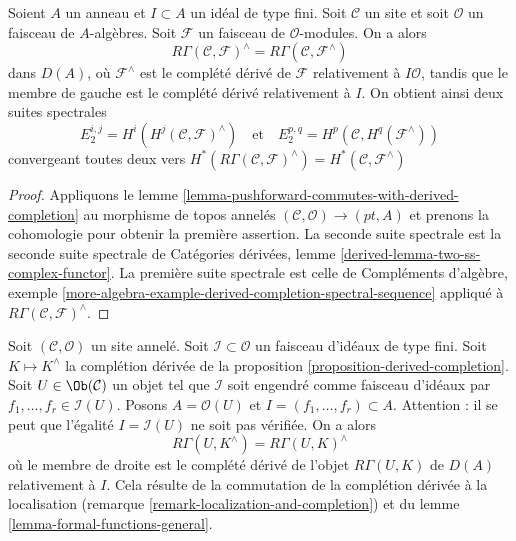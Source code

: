 \begin{lemma}
\label{lemma-formal-functions-general}
Soient $A$ un anneau et $I \subset A$ un idéal de type fini.
Soit $\mathcal{C}$ un site et soit $\mathcal{O}$ un faisceau
de $A$-algèbres. Soit $\mathcal{F}$ un faisceau de $\mathcal{O}$-modules.
On a alors
$$
R\Gamma(\mathcal{C}, \mathcal{F})^\wedge =
R\Gamma(\mathcal{C}, \mathcal{F}^\wedge)
$$
dans $D(A)$, où $\mathcal{F}^\wedge$ est le complété
dérivé de $\mathcal{F}$ relativement à $I\mathcal{O}$, tandis que le membre de
gauche est le complété dérivé relativement à $I$.
On obtient ainsi deux suites spectrales
$$
E_2^{i, j} = H^i(H^j(\mathcal{C}, \mathcal{F})^\wedge)
\quad\text{et}\quad
E_2^{p, q} = H^p(\mathcal{C}, H^q(\mathcal{F}^\wedge))
$$
convergeant toutes deux vers
$H^*(R\Gamma(\mathcal{C}, \mathcal{F})^\wedge) =
H^*(\mathcal{C}, \mathcal{F}^\wedge)$
\end{lemma}

\begin{proof}
Appliquons le lemme \ref{lemma-pushforward-commutes-with-derived-completion}
au morphisme de topos annelés $(\mathcal{C}, \mathcal{O}) \to (pt, A)$
et prenons la cohomologie pour obtenir la première assertion. La seconde suite spectrale
est la seconde suite spectrale de
Catégories dérivées, lemme \ref{derived-lemma-two-ss-complex-functor}.
La première suite spectrale est celle de
Compléments d'algèbre, exemple
\ref{more-algebra-example-derived-completion-spectral-sequence}
appliqué à $R\Gamma(\mathcal{C}, \mathcal{F})^\wedge$.
\end{proof}

\begin{remark}
\label{remark-local-calculation-derived-completion}
Soit $(\mathcal{C}, \mathcal{O})$ un site annelé.
Soit $\mathcal{I} \subset \mathcal{O}$ un faisceau d'idéaux
de type fini. Soit $K \mapsto K^\wedge$ la complétion dérivée de la
proposition \ref{proposition-derived-completion}.
Soit $U \in \Ob(\mathcal{C})$ un objet tel que $\mathcal{I}$
soit engendré comme faisceau d'idéaux par $f_1, \ldots, f_r \in \mathcal{I}(U)$.
Posons $A = \mathcal{O}(U)$ et $I = (f_1, \ldots, f_r) \subset A$.
Attention : il se peut que l'égalité $I = \mathcal{I}(U)$ ne soit pas vérifiée.
On a alors
$$
R\Gamma(U, K^\wedge) = R\Gamma(U, K)^\wedge
$$
où le membre de droite est le complété dérivé de
l'objet $R\Gamma(U, K)$ de $D(A)$ relativement à $I$.
Cela résulte de la commutation de la complétion dérivée à la localisation
(remarque \ref{remark-localization-and-completion}) et du
lemme \ref{lemma-formal-functions-general}.
\end{remark}









